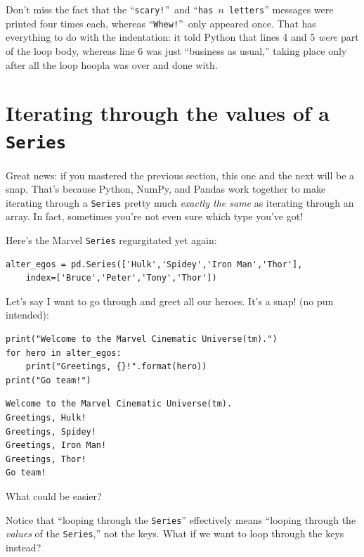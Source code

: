 Don't miss the fact that the ``\texttt{scary!}''~and ``\texttt{has $n$
letters}'' messages were printed four times each, whereas
``\texttt{Whew!}''~only appeared once. That has everything to do with the
indentation: it told Python that lines 4 and 5 \textit{were} part of the loop
body, whereas line 6 was just ``business as usual,'' taking place only after
all the loop hoopla was over and done with.

\section{Iterating through the values of a \texttt{Series}}

\label{seriesLoops}

Great news: if you mastered the previous section, this one and the next will be
a snap. That's because Python, NumPy, and Pandas work together to make
iterating through a \texttt{Series} pretty much \textit{exactly the same} as
iterating through an array. In fact, sometimes you're not even sure which type
you've got!


Here's the Marvel \texttt{Series} regurgitated yet again:

\begin{Verbatim}[fontsize=\small,samepage=true,frame=single,framesep=3mm]
alter_egos = pd.Series(['Hulk','Spidey','Iron Man','Thor'],
    index=['Bruce','Peter','Tony','Thor'])
\end{Verbatim}


Let's say I want to go through and greet all our heroes. It's a snap! (no pun
intended):

\begin{Verbatim}[fontsize=\small,samepage=true,frame=single,framesep=3mm]
print("Welcome to the Marvel Cinematic Universe(tm).")
for hero in alter_egos:
    print("Greetings, {}!".format(hero))
print("Go team!")
\end{Verbatim}

\begin{Verbatim}[fontsize=\small,samepage=true,frame=leftline,framesep=5mm,framerule=1mm]
Welcome to the Marvel Cinematic Universe(tm).
Greetings, Hulk!
Greetings, Spidey!
Greetings, Iron Man!
Greetings, Thor!
Go team!
\end{Verbatim}

What could be easier?

Notice that ``looping through the \texttt{Series}'' effectively means ``looping
through the \textit{values} of the \texttt{Series},'' not the keys. What if we
want to loop through the keys instead?


